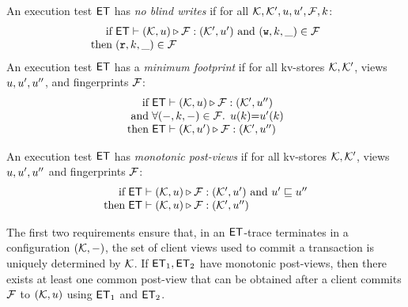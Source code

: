 \begin{definition}[$\ET$ properties]
\label{def:et_properties}
An execution test $\ET$ has \emph{no blind writes} if
for all $\mathcal{K}, \mathcal{K}', u, u', \mathcal{F}, k$:\\
\[
\begin{array}{@{} r @{\hspace{3pt}} l @{}}
\text{if} & \ET \vdash (\hh, \vi) \triangleright \opset: (\hh',\vi' ) 
\text{ and } (\otW, \ke, \_) \in \opset \\
\text{then} & (\otR, \ke, \_) \in \opset
\end{array} 
\]
An execution test $\ET$ has a \emph{minimum footprint} if for all kv-stores $\mathcal{K}, \mathcal{K}'$,
views $u, u',u''$, and fingerprints $\mathcal{F}$: 
%
\[
\begin{array}{@{} r @{\hspace{3pt}} l @{}}
    \text{if} & \ET \vdash (\hh, \vi) \triangleright \opset : (\hh', \vi'')  \\
    \text{and} & \fora{(\stub, \ke, \stub) \in \f} \vi(\ke) {=} \vi'(\ke) \\
\text{then} & \ET \vdash (\hh, \vi') \triangleright \opset : (\hh', \vi'')
\end{array} 
\]
%

An execution test $\ET$ has \emph{monotonic post-views} if 
for all kv-stores $\mathcal{K},\mathcal{K}'$, 
views $u, u',u''$ and fingerprints $\mathcal{F}$:
\[
\begin{array}{@{} r @{\hspace{3pt}} l @{}}
    \text{if} & \ET \vdash (\hh, \vi) \triangleright \opset : (\hh',\vi' )
    \text{ and } \vi' \sqsubseteq \vi''  \\
    \text{then} & \ET \vdash (\hh, \vi) \triangleright \opset : (\hh',\vi'')
\end{array} 
\]
\end{definition}
The first two requirements ensure that, in an $\ET$-trace 
terminates in a configuration $(\mathcal{K}, -)$, 
the set of client views used to commit a transaction is uniquely determined by $\mathcal{K}$. 
If $\mathsf{ET}_1, \mathsf{ET}_2$ have monotonic post-views, then there exists at least one common post-view 
that can be obtained after a client commits $\mathcal{F}$ to $(\mathcal{K}, u)$ using $\mathsf{ET}_1$ and $\mathsf{ET}_2$. 

